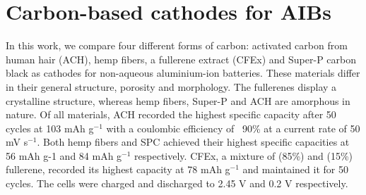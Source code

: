 \chapter{Carbon-based cathodes for AIBs} %

\label{Chapter1} %


\newcommand{\keyword}[1]{\textbf{#1}}
\newcommand{\tabhead}[1]{\textbf{#1}}
\newcommand{\code}[1]{\texttt{#1}}
\newcommand{\file}[1]{\texttt{\bfseries#1}}
\newcommand{\option}[1]{\texttt{\itshape#1}}
 In this work, we compare four different forms of carbon: activated carbon from human hair (ACH), hemp fibers, a fullerene extract (CFEx) and Super-P carbon black as cathodes for non-aqueous aluminium-ion batteries. These materials differ in their general structure, porosity and morphology. The fullerenes display a crystalline structure, whereas hemp fibers, Super-P and ACH are amorphous in nature. Of all materials, ACH recorded the highest specific capacity after 50 cycles at 103 mAh g$^{-1}$ with a coulombic efficiency of ~90\% at a current rate of 50 mV s$^{-1}$. Both hemp fibers and SPC achieved their highest specific capacities at 56 mAh g-1 and 84 mAh g$^{-1}$ respectively. CFEx, a mixture of  (85\%) and  (15\%) fullerene, recorded its highest capacity at 78 mAh g$^{-1}$ and maintained it for 50 cycles. The cells were charged and discharged to 2.45 V and 0.2 V respectively. 
